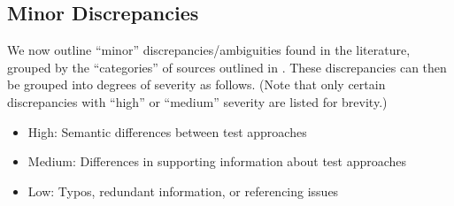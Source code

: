 

\subsection{Minor Discrepancies}
\label{minor-discrep}

We now outline ``minor'' discrepancies/ambiguities found
in the literature, grouped by the ``categories'' of sources outlined in
. These discrepancies can then be grouped into degrees of
severity as follows. (Note that only certain discrepancies with ``high'' or
``medium'' severity are listed for brevity.)

\begin{itemize}
      \item High: Semantic differences between test approaches
      \item Medium: Differences in supporting information about test approaches
      \item Low: Typos, redundant information, or referencing issues
\end{itemize}

